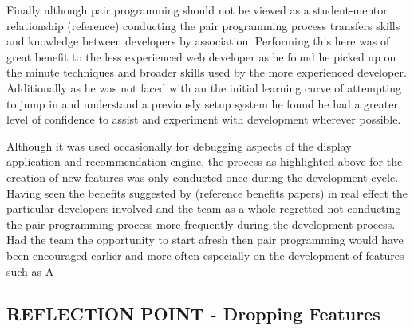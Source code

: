 \documentclass{l3proj}
\begin{document}
Finally although pair programming should not be viewed as a student-mentor relationship (reference) conducting the pair programming process transfers skills and knowledge between developers by association. Performing this here was of great benefit to the less experienced web developer as he found he picked up on the minute techniques and broader skills used by the more experienced developer. Additionally as he was not faced with an the initial learning curve of attempting to jump in and understand a previously setup system he found he had a greater level of confidence to assist and experiment with development wherever possible.  

Although it was used occasionally for debugging aspects of the display application and recommendation engine, the process as highlighted above for the creation of new features was only conducted once during the development cycle. Having seen the benefits suggested by (reference benefits papers) in real effect the particular developers involved and the team as a whole regretted not conducting the pair programming process more frequently during the development process. Had the team the opportunity to start afresh then pair programming would have been encouraged earlier and more often especially on the development of features such as A


\subsection{REFLECTION POINT - Dropping Features}
\label{sec:droppingreflection}
\end{document}
